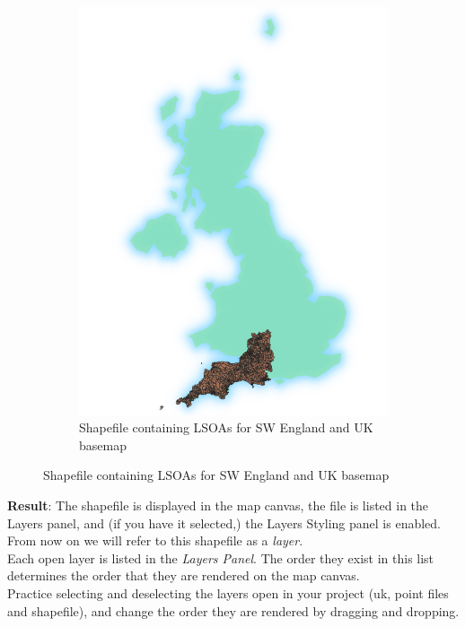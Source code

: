 \begin{figure}[h!]
\begin{subfigure}{0.3\textwidth}
		\includegraphics[width=\linewidth]{images/shapefile_added_to_uk_basemap.png}
		\caption{Shapefile containing LSOAs for SW England and UK basemap} \label{ft_fig_firstfig3}
	\end{subfigure}
\end{figure}

\textbf{Result}: The shapefile is displayed in the map canvas, the file is listed in the Layers panel, and (if you have it selected,) the Layers Styling panel is enabled.\\

From now on we will refer to this shapefile as a \textit{layer}.\\

Each open layer is listed in the \textit{Layers Panel}. The order they exist in this list determines the order that they are rendered on the map canvas.\\

Practice selecting and deselecting the layers open in your project (uk, point files and shapefile), and change the order they are rendered by dragging and dropping.

